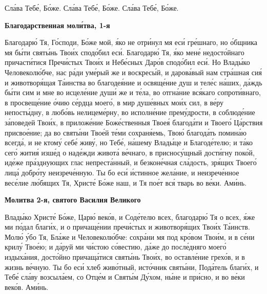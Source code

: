\mychapterending




Сла́ва Тебе́, Бо́же.
Сла́ва Тебе́, Бо́же. Сла́ва Тебе́, Бо́же.





\bfseries Благодарственная моли́тва, 1-я\normalfont{}


   Благодарю́ Тя, Го́споди, Бо́же мой, я́ко не отри́нул мя еси́ гре́шнаго, но
о́бщника мя бы́ти святы́нь Твои́х сподо́бил еси́. Благодарю́ Тя, я́ко
мене́ недосто́йнаго причасти́тися Пречи́стых Твои́х и Небе́сных Даро́в
сподо́бил еси́. Но Влады́ко Человеколю́бче, нас ра́ди уме́рый же и
воскресы́й, и дарова́вый нам стра́шная сия́ и животворя́щая Та́инства во
благодея́ние и освяще́ние душ и теле́с на́ших, да́ждь бы́ти сим и мне
во исцеле́ние души́ же и те́ла, во отгна́ние вся́каго сопроти́внаго, в
просвеще́ние о́чию се́рдца моего́, в мир душе́вных мои́х сил, в ве́ру
непосты́дну, в любо́вь нелицеме́рну, во исполне́ние прему́дрости, в
соблюде́ние за́поведей Твои́х, в приложе́ние Боже́ственныя Твоея́
благода́ти и Твоего́ Ца́рствия присвое́ние; да во святы́ни Твое́й те́ми
сохраня́емь, Твою́ благода́ть помина́ю всегда́, и не ктому́ себе́ живу́, но Тебе́,
на́шему Влады́це и Благоде́телю; и та́ко сего́ жития́ изше́д о наде́жди
живота́ ве́чнаго, в присносу́щный дости́гну поко́й, иде́же пра́зднующих
глас непреста́нный, и безконе́чная сла́дость, зря́щих Твоего́ лица́
добро́ту неизрече́нную. Ты бо еси́ и́стинное жела́ние, и неизрече́нное
весе́лие лю́бящих Тя, Христе́ Бо́же наш, и Тя пое́т вся́ тварь во ве́ки.
Ами́нь.



 

\bfseries Молитва 2-я, святого Василия Великого\normalfont{}


   Влады́ко Христе́ Бо́же, Царю́ веко́в, и Соде́телю всех, благодарю́ Тя о
всех, я́же ми по́дал благи́х, и о причаще́нии пречи́стых и животворя́щих
Твои́х Та́инств. Молю́ у́бо Тя, Бла́же и Человеколю́бче: сохра́ни мя под
кро́вом Твои́м, и в се́ни крилу́ Твое́ю; и да́руй ми чи́стою со́вестию, да́же до
после́дняго моего́ издыха́ния, досто́йно причаща́тися святы́нь Твои́х, во
оставле́ние грехо́в, и в жизнь ве́чную. Ты бо еси́ хлеб живо́тный, исто́чник
святы́ни, Пода́тель благи́х, и Тебе́ сла́ву возсыла́ем, со Отце́м и Святы́м
Ду́хом, ны́не и при́сно, и во ве́ки веко́в. Ами́нь.




